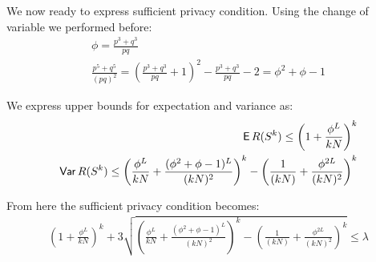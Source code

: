 \documentclass[11pt]{article}
\begin{document}
We now ready to express sufficient privacy condition.  Using the change of variable we performed before:
\begin{align*}
\phi = \frac{p^3 + q^3}{pq} \\
 \frac{p^5 + q^5}{(pq)^2} = \left (  \frac{p^3 + q^3}{pq}  + 1 \right )^2 -  \frac{p^3 + q^3}{pq} - 2 = \phi^2  + \phi - 1
\end{align*}

We express upper bounds for expectation and variance as:
\begin{align*}
\operatorname{\mathsf{E}} R(S^k) \le \left ( 1 +  \frac{ \phi^L}{kN} \right )^k \\
\operatorname{\mathsf{Var}} R(S^k) \le  \left ( \frac{ \phi^L}{kN} +  \frac{( \phi^2 + \phi - 1)^L}{(kN)^2}\right )^k -  \left (  \frac{1}  {(kN)} +   \frac{\phi^{2L}} {(kN)^{2}}  \right )^k
\end{align*}

From here the sufficient privacy condition becomes:
\begin{align}
\left ( 1 +  \frac{ \phi^L}{kN} \right )^k  + 3 \sqrt{  \left ( \frac{ \phi^L}{kN} +  \frac{( \phi^2 + \phi - 1)^L}{(kN)^2}\right )^k -  \left (  \frac{1}  {(kN)} +   \frac{\phi^{2L}} {(kN)^{2}}  \right )^k } \le \lambda
\end{align}
\end{document}

